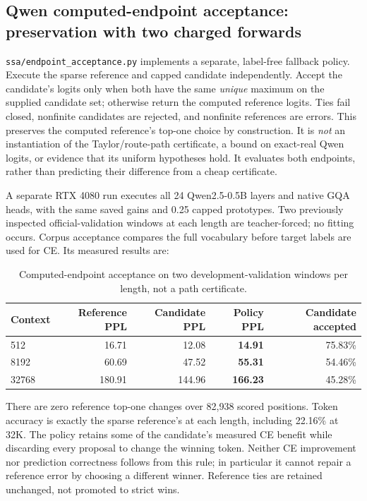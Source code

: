 \documentclass[11pt]{article}
\numberwithin{equation}{section}
\begin{document}
\subsection{Qwen computed-endpoint acceptance: preservation with two charged forwards}

\nolinkurl{ssa/endpoint_acceptance.py} implements a separate, label-free fallback policy. Execute the
sparse reference and capped candidate independently. Accept the candidate's logits only when both have
the same \emph{unique} maximum on the supplied candidate set; otherwise return the computed reference
logits. Ties fail closed, nonfinite candidates are rejected, and nonfinite references are errors. This
preserves the computed reference's top-one choice by construction. It is \emph{not} an instantiation of
the Taylor/route-path certificate, a bound on exact-real Qwen logits, or evidence that its uniform
hypotheses hold. It evaluates both endpoints, rather than predicting their difference from a cheap certificate.

A separate RTX 4080 run executes all 24 Qwen2.5-0.5B layers and native GQA heads, with the same saved
gains and 0.25 capped prototypes. Two previously inspected official-validation windows at each length
are teacher-forced; no fitting occurs. Corpus acceptance compares the full vocabulary before target
labels are used for CE. Its measured results are:
\begin{table}[ht]
\centering\small
\begin{tabular}{lrrrr}\toprule
Context & Reference PPL & Candidate PPL & Policy PPL & Candidate accepted\\\midrule
512 & 16.71 & 12.08 & \textbf{14.91} & 75.83\%\\
8192 & 60.69 & 47.52 & \textbf{55.31} & 54.46\%\\
32768 & 180.91 & 144.96 & \textbf{166.23} & 45.28\%\\\bottomrule
\end{tabular}
\caption{Computed-endpoint acceptance on two development-validation windows per length, not a path certificate.}
\end{table}

There are zero reference top-one changes over 82,938 scored positions. Token accuracy is exactly the
sparse reference's at each length, including 22.16\% at 32K. The policy retains some of the candidate's
measured CE benefit while discarding every proposal to change the winning token. Neither CE improvement
nor prediction correctness follows from this rule; in particular it cannot repair a reference error by
choosing a different winner. Reference ties are retained unchanged, not promoted to strict wins.
\end{document}
